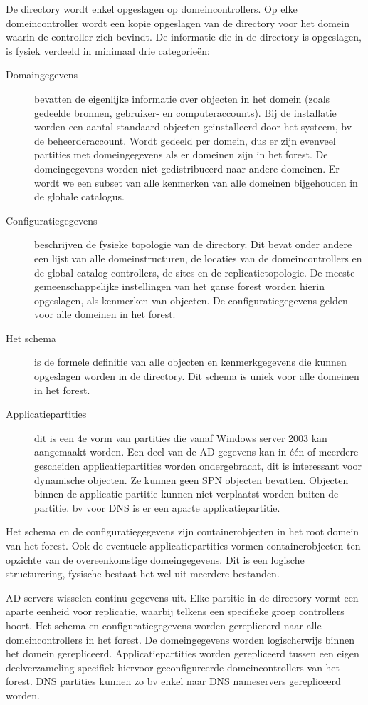 De directory wordt enkel opgeslagen op domeincontrollers. Op elke
domeincontroller wordt een kopie opgeslagen van de directory voor het domein
waarin de controller zich bevindt. De informatie die in de directory is
opgeslagen, is fysiek verdeeld in minimaal drie categorieën: 
\begin{description}
	\item[Domaingegevens] bevatten de eigenlijke informatie over objecten in
		het domein (zoals gedeelde bronnen, gebruiker- en
		computeraccounts). Bij de installatie worden een aantal
		standaard objecten geinstalleerd door het systeem, bv de
		beheerderaccount. Wordt gedeeld per domein, dus er zijn evenveel
		partities met domeingegevens als er domeinen zijn in het forest.
		De domeingegevens worden niet gedistribueerd naar andere
		domeinen. Er wordt we een subset van alle kenmerken van alle
		domeinen bijgehouden in de globale catalogus.
	\item[Configuratiegegevens] beschrijven de fysieke topologie van de
		directory. Dit bevat onder andere een lijst van alle
		domeinstructuren, de locaties van de domeincontrollers en de
		global catalog controllers, de sites en de replicatietopologie.
		De meeste gemeenschappelijke instellingen van het ganse forest
		worden hierin opgeslagen, als kenmerken van objecten. De
		configuratiegegevens gelden voor alle domeinen in het forest.
	\item[Het schema] is de formele definitie van alle objecten en
		kenmerkgegevens die kunnen opgeslagen worden in de directory.
		Dit schema is uniek voor alle domeinen in het forest.
	\item[Applicatiepartities] dit is een 4e vorm van partities die vanaf
		Windows server 2003 kan aangemaakt worden. Een deel van de AD
		gegevens kan in één of meerdere gescheiden applicatiepartities
		worden ondergebracht, dit is interessant voor dynamische
		objecten. Ze kunnen geen SPN objecten bevatten.  Objecten binnen
		de applicatie partitie kunnen niet verplaatst worden buiten de
		partitie. bv voor DNS is er een aparte applicatiepartitie.
\end{description}

Het schema en de configuratiegegevens zijn containerobjecten in het root domein
van het forest. Ook de eventuele applicatiepartities vormen containerobjecten
ten opzichte van de overeenkomstige domeingegevens. Dit is een logische
structurering, fysische bestaat het wel uit meerdere bestanden.

AD servers wisselen continu gegevens uit. Elke partitie in de directory vormt
een aparte eenheid voor replicatie, waarbij telkens een specifieke groep
controllers hoort. Het schema en configuratiegegevens worden gerepliceerd naar
alle domeincontrollers in het forest. De domeingegevens worden logischerwijs
binnen het domein gerepliceerd. Applicatiepartities worden gerepliceerd tussen
een eigen deelverzameling specifiek hiervoor geconfigureerde domeincontrollers
van het forest. DNS partities kunnen zo bv enkel naar DNS nameservers
gerepliceerd worden.

